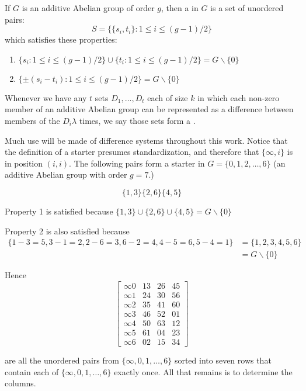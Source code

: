 If $G$ is an additive Abelian group of order $g$, then a  in $G$ is a set of unordered pairs:
\begin{equation*}
S = \{\{s_i, t_i\}:1 \leq i \leq (g - 1)/2\}
\end{equation*}
which satisfies these properties:

\begin{enumerate}
  \item{$\{s_i:1 \leq i \leq (g-1)/2\} \cup \{t_i : 1 \leq i \leq (g-1)/2\} = G \backslash \{0\}$}
  \item{$\{\pm (s_i - t_i ) : 1 \leq i \leq (g-1)/2 \} = G \backslash \{0\}$}
\end{enumerate}

Whenever we have any $t$ sets $D_1, \ldots, D_t$ each of size $k$ in which each non-zero member of an additive Abelian group can be represented as a difference between members of the $D_i \lambda$ times, we say those sets form a .

Much use will be made of difference systems throughout this work.
Notice that the definition of a starter presumes standardization, and therefore that $\{\infty, i\}$ is in position $(i, i)$.
The following pairs form a starter in $G = \{0, 1, 2, \ldots, 6\}$ (an additive Abelian group with order $g = 7$.)

\begin{equation}
\{1,3\} \{2,6\} \{4,5\}
\end{equation}

Property 1 is satisfied because
$\{1,3\} \cup \{2,6\} \cup \{4,5\} = G \backslash \{0\}$

Property 2 is also satisfied because
\begin{equation}
\begin{split}
\{1 - 3 = 5, 3 - 1 = 2, 2 - 6 = 3, 6 - 2 = 4, 4 - 5 = 6, 5 - 4 = 1\} &= \{1, 2, 3, 4, 5, 6\} \\
 &= G\backslash \{0\}
\end{split}
\end{equation}

Hence
\begin{equation}
  \begin{bmatrix}
    \infty 0 &  13 &  26 &  45 \\
    \infty 1 &  24 &  30 &  56 \\
    \infty 2 &  35 &  41 &  60 \\
    \infty 3 &  46 &  52 &  01 \\
    \infty 4 &  50 &  63 &  12 \\
    \infty 5 &  61 &  04 &  23 \\
    \infty 6 &  02 &  15 &  34
  \end{bmatrix}
  \label{eq:starter}
\end{equation}

are all the unordered pairs from $\{\infty, 0, 1, \ldots, 6\}$ sorted into seven rows that contain each of $\{\infty, 0, 1, \ldots, 6\}$ exactly once.
All that remains is to determine the columns.
